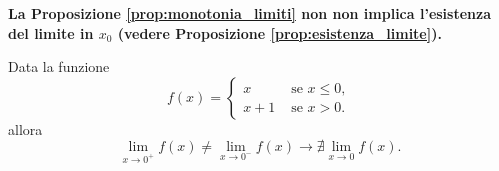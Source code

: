 \begin{remark}
    \textbf{La Proposizione \ref{prop:monotonia_limiti} non non implica l'esistenza del limite in $x_0$ (vedere Proposizione \ref{prop:esistenza_limite}).}
\end{remark}

\begin{example}
Data la funzione
 \begin{equation*}
     f(x)=
     \begin{cases}
         x &\text{ se } x\leq 0,\\
         x+1 &\text{ se } x>0.
     \end{cases}
 \end{equation*}
 allora
 \begin{equation*}
     \lim_{x\rightarrow 0^+}f(x)\neq\lim_{x\rightarrow 0^-}f(x)\rightarrow\nexists\lim_{x\rightarrow 0}f(x).
 \end{equation*}
\end{example}